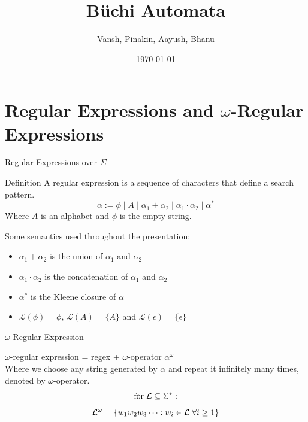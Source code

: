 \documentclass[14pts]{beamer}
\title{Büchi Automata}
\date{\today}
\author{Vansh, Pinakin, Aayush, Bhanu}
\institute{Indian Institute of Science, Bangalore}
\begin{document}
  \maketitle
  \tableofcontents  
  \section{Regular Expressions and $\omega$-Regular Expressions}
  \begin{frame}{Regular Expressions over $\Sigma$}
    \begin{block}{Definition}
      A regular expression is a sequence of characters that define a search pattern.
      \[\alpha := \phi \mid A \mid \alpha_1 + \alpha_2 \mid \alpha_1\cdot\alpha_2 \mid \alpha^*\]
      Where $A$ is an alphabet and $\phi$ is the empty string.
    \end{block}
    Some semantics used throughout the presentation:
    \begin{itemize}
      \item<1-> $\alpha_1 + \alpha_2$ is the union of $\alpha_1$ and $\alpha_2$
      \item<2-> $\alpha_1\cdot\alpha_2$ is the concatenation of $\alpha_1$ and $\alpha_2$
      \item<3-> $\alpha^*$ is the Kleene closure of $\alpha$
      \item<4-> $\mathcal{L}(\phi) = \phi$, $\mathcal{L}(A) = \{A\}$ and $\mathcal{L}(\epsilon)= \{\epsilon\}$
    \end{itemize}
  \end{frame}
  \begin{frame}{$\omega$-Regular Expression}
    \begin{definition}
      $\omega$-regular expression = regex + $\omega$-operator $\alpha^\omega$\\
      Where we choose any string generated by $\alpha$ and repeat it infinitely many times, denoted by $\omega$-operator.
      \[\text{for} \hspace{1mm} \mathcal{L} \subseteq \Sigma^*:\]
      \[\mathcal{L}^{\omega} = \{w_1w_2w_3\cdots: w_i \in \mathcal{L}\hspace{1mm} \forall i \geq 1\} \]
    \end{definition}
  \end{frame}
\end{document}
